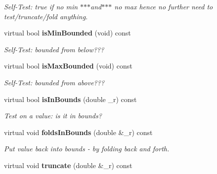 \begin{CompactItemize}
\begin{CompactList}\small\item\em Self-Test: true if no min $\ast$$\ast$$\ast$and$\ast$$\ast$$\ast$ no max hence no further need to test/truncate/fold anything. \item\end{CompactList}\item 
virtual bool {\bf is\-Min\-Bounded} (void) const \label{classeo_real_below_bound_a8}

\begin{CompactList}\small\item\em Self-Test: bounded from below??? \item\end{CompactList}\item 
virtual bool {\bf is\-Max\-Bounded} (void) const \label{classeo_real_below_bound_a9}

\begin{CompactList}\small\item\em Self-Test: bounded from above??? \item\end{CompactList}\item 
virtual bool {\bf is\-In\-Bounds} (double \_\-r) const \label{classeo_real_below_bound_a10}

\begin{CompactList}\small\item\em Test on a value: is it in bounds? \item\end{CompactList}\item 
virtual void {\bf folds\-In\-Bounds} (double \&\_\-r) const \label{classeo_real_below_bound_a11}

\begin{CompactList}\small\item\em Put value back into bounds - by folding back and forth. \item\end{CompactList}\item 
virtual void {\bf truncate} (double \&\_\-r) const \label{classeo_real_below_bound_a12}


\end{CompactItemize}
